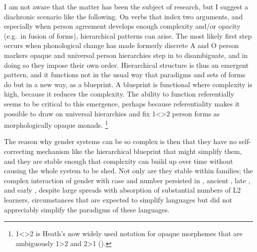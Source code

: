 \documentclass[output=collectionpaper]{langsci/langscibook}
\begin{document}
I am not aware that the matter has been the subject of research, but I suggest a diachronic scenario like the following. On verbs that index two arguments, and especially when person agreement develops enough complexity and/or opacity (e.g.\ in fusion of forms), hierarchical patterns can arise. The most likely first step occurs when phonological change has made formerly discrete A and O person markers opaque and universal person hierarchies step in to disambiguate, and in doing so they impose their own order. Hierarchical structure is thus an emergent pattern, and it functions not in the usual way that paradigms and sets of forms do but in a new way, as a blueprint. A blueprint is functional where complexity is high, because it reduces the complexity. The ability to function referentially seems to be critical to this emergence, perhaps because referentiality makes it possible to draw on universal hierarchies and fix 1<>2 person forms as morphologically opaque monads.%
\footnote{%
1<>2 is Heath's now widely used notation for opaque morphemes that are ambiguously 1>2 and 2>1 (\citealt*{Heath1998}).
}%

The reason why gender systems can be so complex is then that they have no self-correcting mechanism like the hierarchical blueprint that might simplify them, and they are stable enough that complexity can build up over time without causing the whole system to be shed. Not only are they stable within families; the complex interaction of gender with case and number persisted in , ancient , late , and early , despite large spreads with absorption of substantial numbers of L2 learners, circumstances that are expected to simplify languages but did not appreciably simplify the paradigms of these languages.
\end{document}
